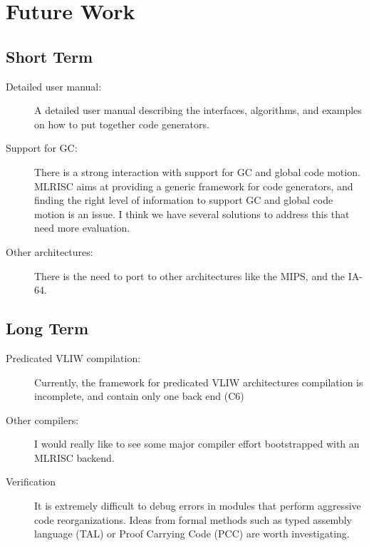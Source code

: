 \section{Future Work}
\subsection{Short Term}

\begin{description}    
\item[Detailed user manual:]
    A detailed user manual describing the interfaces, algorithms, 
    and examples on how to put together code generators.
\item[Support for GC:]
      There is a strong interaction
     with support for GC and global code motion. MLRISC aims at
     providing a generic framework for code generators, and finding
     the right level of information to support GC and global code
     motion is an issue. I think we have several solutions to address
     this that need more evaluation.
\item[Other architectures:] There is the need to port
     to other architectures like the MIPS, and the IA-64. 
\end{description}
\hr
\subsection{Long Term}
\begin{description}
 \item[Predicated VLIW compilation:] Currently, the framework
for predicated VLIW architectures compilation
is incomplete, and contain only one back end (C6)
\item[Other compilers:] I would really like to see some
major compiler effort bootstrapped with an MLRISC backend.
\item[Verification] It is extremely difficult to
debug errors in modules that perform aggressive code
reorganizations. Ideas from formal methods such as typed assembly
language (TAL) or Proof Carrying Code (PCC) are worth investigating.
\end{description}
